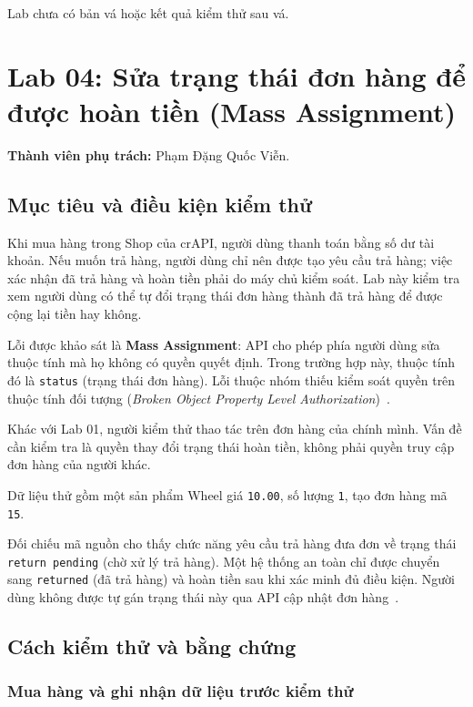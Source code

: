 \documentclass[oneside,a4paper,12pt]{extreport}
\begin{document}
Lab chưa có bản vá hoặc kết quả kiểm thử sau vá.

\clearpage
\section{Lab 04: Sửa trạng thái đơn hàng để được hoàn tiền (Mass Assignment)}
\label{chap:lab04}

\noindent\textbf{Thành viên phụ trách:} Phạm Đặng Quốc Viễn.

\subsection{Mục tiêu và điều kiện kiểm thử}

Khi mua hàng trong Shop của crAPI, người dùng thanh toán bằng số dư tài
khoản. Nếu muốn trả hàng, người dùng chỉ nên được tạo yêu cầu trả hàng;
việc xác nhận đã trả hàng và hoàn tiền phải do máy chủ kiểm soát.
Lab này kiểm tra xem người dùng có thể tự đổi trạng thái đơn hàng thành
đã trả hàng để được cộng lại tiền hay không.

Lỗi được khảo sát là \textbf{Mass Assignment}: API cho phép phía người
dùng sửa thuộc tính mà họ không có quyền quyết định. Trong trường hợp
này, thuộc tính đó là \texttt{status} (trạng thái đơn hàng). Lỗi thuộc
nhóm thiếu kiểm soát quyền trên thuộc tính đối tượng
(\textit{Broken Object Property Level Authorization})~\cite{owasp-property}.

Khác với Lab 01, người kiểm thử thao tác trên đơn hàng của chính mình.
Vấn đề cần kiểm tra là quyền thay đổi trạng thái hoàn tiền, không phải
quyền truy cập đơn hàng của người khác.

Dữ liệu thử gồm một sản phẩm Wheel giá \texttt{10.00}, số lượng
\texttt{1}, tạo đơn hàng mã \texttt{15}.

Đối chiếu mã nguồn cho thấy chức năng yêu cầu trả hàng đưa đơn về trạng
thái \texttt{return pending} (chờ xử lý trả hàng). Một hệ thống an toàn
chỉ được chuyển sang \texttt{returned} (đã trả hàng) và hoàn tiền sau
khi xác minh đủ điều kiện. Người dùng không được tự gán trạng thái này
qua API cập nhật đơn hàng~\cite{crapi-shop}.

\subsection{Cách kiểm thử và bằng chứng}

\subsubsection{Mua hàng và ghi nhận dữ liệu trước kiểm thử}
\end{document}
